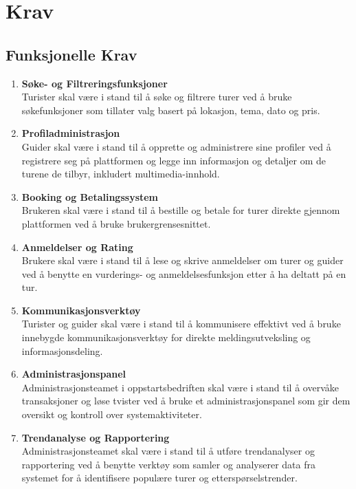\documentclass[../doc.tex]{subfiles}
\begin{document}
\section{Krav}
\subsection{Funksjonelle Krav}
\begin{enumerate}
    \item \textbf{Søke- og Filtreringsfunksjoner} \\
    Turister skal være i stand til å søke og filtrere turer
    ved å bruke søkefunksjoner som tillater valg basert på lokasjon, tema, dato og pris.

    \item \textbf{Profiladministrasjon} \\
    Guider skal være i stand til å opprette og administrere sine profiler 
    ved å registrere seg på plattformen og legge inn informasjon og detaljer om de turene de tilbyr, inkludert multimedia-innhold.

    \item \textbf{Booking og Betalingssystem} \\
    Brukeren skal være i stand til å bestille og betale for turer direkte gjennom plattformen ved å bruke brukergrensesnittet.

    \item \textbf{Anmeldelser og Rating} \\ 
    Brukere skal være i stand til å lese og skrive anmeldelser om turer og guider ved å benytte en 
    vurderings- og anmeldelsesfunksjon etter å ha deltatt på en tur.

    \item \textbf{Kommunikasjonsverktøy} \\
    Turister og guider skal være i stand til å kommunisere effektivt ved å bruke innebygde 
    kommunikasjonsverktøy for direkte meldingsutveksling og informasjonsdeling.

    \item \textbf{Administrasjonspanel} \\
    Administrasjonsteamet i oppstartsbedriften skal være i stand til å overvåke transaksjoner 
    og løse tvister ved å bruke et administrasjonspanel som gir dem oversikt og kontroll over systemaktiviteter.

    \item \textbf{Trendanalyse og Rapportering} \\
    Administrasjonsteamet skal være i stand til å utføre trendanalyser og rapportering ved å 
    benytte verktøy som samler og analyserer data fra systemet for å identifisere populære turer og etterspørselstrender.

\end{enumerate}
\end{document}
